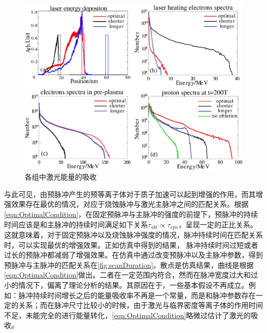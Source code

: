 \begin{figure}[!htbp]
  \centering
  \includegraphics[width=\MyFactor\textwidth]{Img/laserAbsorption.eps}
  \caption{各组中激光能量的吸收}
  \label{fig:laserAbsorption}
\end{figure}



与此可见，由预脉冲产生的预等离子体对于质子加速可以起到增强的作用，而其增强效果存在最优的情况，对应于烧蚀脉冲与激光主脉冲之间的匹配关系。根据\ref{eqn:OptimalCondition}，在固定预脉冲与主脉冲的强度的前提下，预脉冲的持续时间应该是和主脉冲的持续时间满足如下关系${\tau}_{abl} \propto  \tau_{cpa}$，呈现一定的正比关系。这就意味着，对于固定预脉冲以及烧蚀脉冲强度的情况，脉冲持续时间在匹配关系时，可以实现最优的增强效果。正如仿真中得到的结果， 脉冲持续时间过短或者过长的预脉冲都减弱了增强效果。在仿真中通过改变预脉冲以及主脉冲参数，得到预脉冲与主脉冲的匹配关系在\ref{fig:scanDuration}。散点是仿真结果，曲线是根据\ref{eqn:OptimalCondition}做出。二者在一定范围内符合，然而在脉冲宽度过大和过小的情况下，偏离了理论分析的结果。其原因在于，一些基本假设不再成立。例如：脉冲持续时间增长之后的能量吸收率不再是一个常量，而是和脉冲参数存在一定的关系；而在脉冲尺寸比较小的时候，由于激光与临界密度等离子体的作用时间不足，未能完全的进行能量转化，\ref{eqn:OptimalCondition}略微过估计了激光的吸收。



